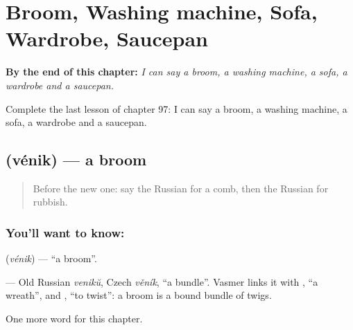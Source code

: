 
\chapter{Broom, Washing machine, Sofa, Wardrobe, Saucepan}
\label{ch:ru-broom-washing-machine-sofa-wardrobe-saucepan}

\begin{chapteropening}
\textbf{By the end of this chapter:} \emph{I can say a broom, a washing machine, a sofa, a wardrobe and a saucepan.}

Complete the last lesson of chapter 97: I can say a broom, a washing machine, a sofa, a wardrobe and a saucepan.
\end{chapteropening}

\section[\texorpdfstring{\ru{веник} (vénik)}{веник (vénik)}]{ (vénik) — a broom}

\label{lesson:RU-C97-broom}



\begin{quote}
Before the new one: say the Russian for a comb, then the Russian for rubbish.
\end{quote}

\subsection*{You'll want to know: }
\textbf{} (\emph{vénik}) — \textquotedblleft{}a broom\textquotedblright{}.

\begin{cousinweb}
\textbf{} — Old Russian \emph{venikŭ}, Czech \emph{věník}, \textquotedblleft{}a bundle\textquotedblright{}. Vasmer links it with \emph{}, \textquotedblleft{}a wreath\textquotedblright{}, and \emph{}, \textquotedblleft{}to twist\textquotedblright{}: a broom is a bound bundle of twigs.
\end{cousinweb}

\begin{grammarlens}[title={What you've built}]
One more word for this chapter.
\end{grammarlens}


